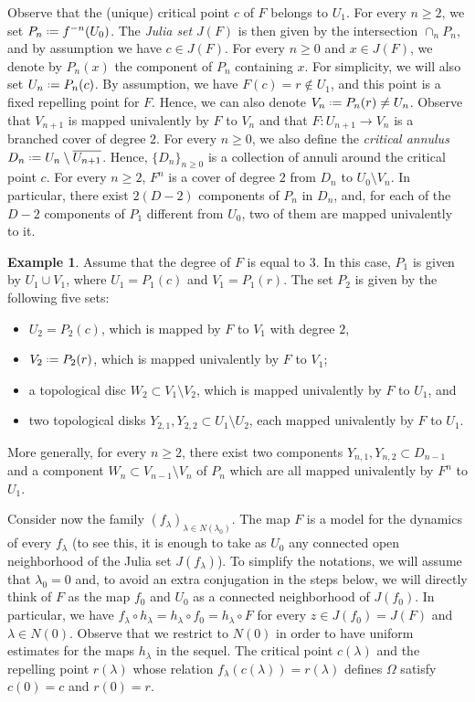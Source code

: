 \documentclass[11pt]{amsart}
\theoremstyle{plain}
\theoremstyle{definition}
\newtheorem{example}[thm]{Example}
\theoremstyle{remark}
\newcommand*{\defeq}{\mathrel{\vcenter{\baselineskip0.5ex \lineskiplimit0pt
			\hbox{\scriptsize.}\hbox{\scriptsize.}}}%
	=}
\begin{document}
\medskip

Observe that the (unique) critical point $c$ of $F$ belongs to $U_1$. For every $n \ge 2$, we set
$P_n \defeq f^{-n} (U_0)$. The 
\emph{Julia set}
$J(F)$ is then given by the intersection
$\cap_n P_n$, and by assumption
we have $c\in J(F)$.
For every $n \ge 0$ and $x\in J(F)$,
we denote by
$P_n (x)$ the component of $P_n$ containing $x$. For simplicity, 
we will also set $U_n\defeq P_n (c)$.
By assumption, we have $F(c)= r\notin U_1$, and this point is a fixed repelling point for $F$.
Hence, we can also denote
$V_n \defeq P_n(r)\neq U_n$. 
Observe that $V_{n+1}$ is mapped univalently by $F$
to $V_n$ and
that $F\colon U_{n+1}\to V_n$
is a branched cover of degree $2$. 
For every $n \ge 0$, 
we also
define the {\it critical annulus} $D_n \defeq U_n \setminus \overline{U_{n+1}}$. Hence, 
$\{D_n\}_{n\ge0}$ is a collection of annuli around the critical point $c$.
For every $n \ge 2$, 
$F^n$ is a 
cover of degree $2$ from $D_n$ to $U_0\setminus V_n$. In particular,
there exist
$2(D-2)$ components
of $P_n$ 
in $D_n$, and, for each of the $D-2$ components of $P_1$ different from $U_0$,
two of them are mapped univalently
to it.


\begin{example}\label{ex:deg3}
Assume that the degree of $F$ is 
equal to $3$. In this case, $P_1$ is given by $U_1\cup V_1$,
where
$U_1 = P_1 (c)$
and
$V_1=P_1(r)$. The set $P_2$ is given by the following five sets: 
\begin{itemize}
    \item  $U_2=P_2(c)$, which is mapped by $F$ to $V_1$ with degree $2$, 
    \item $V_2 \defeq P_2 (r)$,
    which is mapped univalently by $F$ to $V_1$;
    \item a topological disc $W_2\subset V_1\setminus V_2$, which is mapped univalently by $F$ to $U_1$, and
    \item two topological disks $Y_{2,1}, Y_{2,2}
    \subset U_1\setminus U_2$, each mapped univalently
    by $F$ to $U_1$.
\end{itemize}
More generally,
for every $n\geq 2$, there exist
two components $Y_{n,1}, Y_{n,2}\subset D_{n-1}$
and a component $W_n\subset V_{n-1}\setminus V_{n}$ of $P_n$
which are all
mapped 
univalently
by $F^n$ to $U_1$. 
\end{example}

Consider now the family $(f_\lambda)_{\lambda\in N(\lambda_0)}$.
The
map $F$ 
is 
a
model for the dynamics of every $f_\lambda$ 
(to see this, it is enough to 
take as $U_0$
any connected
open neighborhood of the Julia set $J(f_\lambda)$).
To 
simplify the notations,
we will assume that $\lambda_0=0$ and,
to avoid an extra conjugation in the steps below, 
we will directly
think of $F$ as the map $f_{0}$ and $U_0$ as a connected
neighborhood of $J(f_0)$. In particular, we have $f_\lambda
\circ h_\lambda
= h_\lambda \circ f_{0} = h_\lambda \circ F$ for every $z\in J(f_0)
= J(F)$ and $\lambda \in N(0)$.
Observe that 
we restrict to $N(0)$
in order to have uniform estimates for the maps $h_\lambda$ in the sequel. The critical point $c(\lambda)$
and the repelling point $r(\lambda)$ whose relation
$f_\lambda (c(\lambda))=r(\lambda)$
defines $\Omega$ satisfy $c(0)=c$ and $r(0)=r$. 
\end{document}
